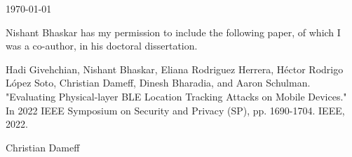 \documentclass{article}
\begin{document}
\today

Nishant Bhaskar has my permission to include the following paper, of which
I was a co-author, in his doctoral dissertation.


Hadi Givehchian, Nishant Bhaskar, Eliana Rodriguez Herrera, Héctor Rodrigo López Soto, Christian Dameff, Dinesh Bharadia, and Aaron Schulman. "Evaluating Physical-layer BLE Location Tracking Attacks on Mobile Devices." In 2022 IEEE Symposium on Security and Privacy (SP), pp. 1690-1704. IEEE, 2022.







\baselineskip
\hrulefill

Christian Dameff
\end{document}
